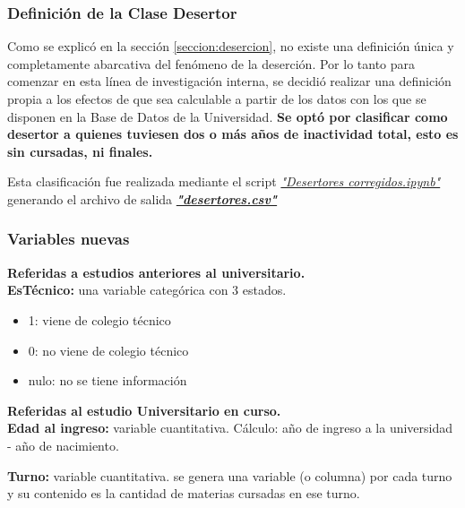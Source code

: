 \subsubsection{Definición de la Clase Desertor}\label{definicion_clase_desertor}

Como se explicó en la sección \ref{seccion:desercion}, no existe una definición única y completamente abarcativa del fenómeno de la deserción. 
Por lo tanto para comenzar en esta línea de investigación interna, se decidió realizar una definición propia a los efectos de que sea calculable a partir de los datos con los que se disponen en la  Base de Datos de la Universidad. \textbf{Se optó por clasificar como desertor a quienes tuviesen dos o más años de inactividad total, esto es sin cursadas, ni finales.}

Esta clasificación fue realizada mediante el script \underline{\textit{"Desertores corregidos.ipynb"}} generando el archivo de salida \underline{\textit{\textbf{"desertores.csv"}}}



\subsubsection{Variables nuevas}

\textbf{Referidas a estudios anteriores al universitario.} \\
\textbf{EsTécnico:} una variable categórica con 3 estados.
\begin{itemize}
\item 1: viene de colegio técnico
\item 0: no viene de colegio técnico
\item nulo: no se tiene información
\end{itemize}

\vspace{3mm}

\textbf{Referidas al estudio Universitario en curso.} \\
\textbf{Edad al ingreso:} variable cuantitativa. Cálculo: año de ingreso a la universidad - año de nacimiento.

\vspace{3mm}

\textbf{Turno:} variable cuantitativa. se genera una variable (o columna) por cada turno y su contenido es la cantidad de materias cursadas en ese turno.

